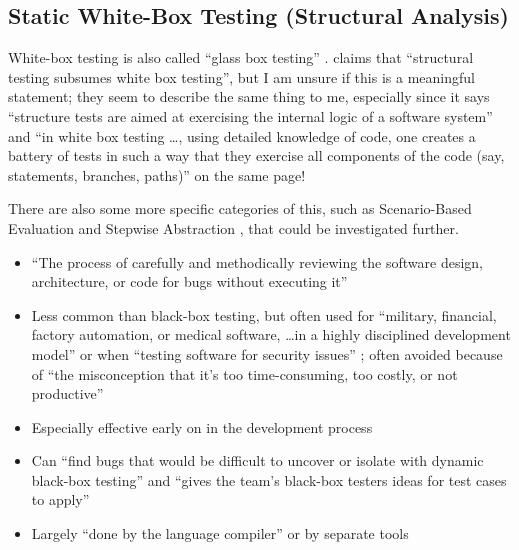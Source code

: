 \subsection{Static White-Box Testing (Structural Analysis)
      \citep[pp.~91-104]{Patton2006}}

White-box testing is also called ``glass box testing''
\citep[p.~439]{PetersAndPedrycz2000}. \citep[p.~447]{PetersAndPedrycz2000} claims
that ``structural testing subsumes white box testing'', but I am unsure if this
is a meaningful statement; they seem to describe the same thing to me, 
especially since it says ``structure tests are aimed at exercising the internal
logic of a software system'' and ``in white box testing \dots, using detailed
knowledge of code, one creates a battery of tests in such a way that they
exercise all components of the code (say, statements, branches, paths)'' on the
same page!

There are also some more specific
categories of this, such as Scenario-Based
Evaluation \citep[pp.~417-418]{vanVliet2000} and Stepwise Abstraction
\citep[pp.~419-420]{vanVliet2000}, that could be investigated further.

\begin{itemize}
      \item ``The process of carefully and methodically reviewing the software
            design, architecture, or code for bugs without executing it''
            \citep[p.~92]{Patton2006}
      \item Less common than black-box testing, but often used for ``military,
            financial, factory automation, or medical software, \dots in a
            highly disciplined development model'' or when ``testing software
            for security issues'' \citep[p.~91]{Patton2006}; often
            avoided because of ``the misconception that it's too
            time-consuming, too costly, or not productive''
            \citep[p.~92]{Patton2006}
      \item Especially effective early on in the development process
            \citep[p.~92]{Patton2006}
      \item Can ``find bugs that would be difficult to uncover or isolate with
            dynamic black-box testing'' and ``gives the team's black-box
            testers ideas for test cases to apply''
            \citep[p.~92]{Patton2006}
      \item Largely ``done by the language compiler'' or by separate tools
            \citep[pp.~413-414]{vanVliet2000}
\end{itemize}

